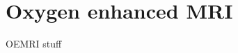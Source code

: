 
\chapter{Oxygen enhanced MRI}
\label{ch:oemri}

OEMRI stuff

\endinput

Any text after an \endinput is ignored.
You could put scraps here or things in progress.
